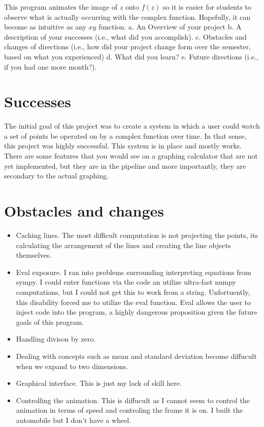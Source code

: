 \documentclass{article}
\begin{document}
    This program animates the image of $z$ onto $f(z)$ so it is easier for students to observe what is actually occurring with the complex function. Hopefully, it can become as intuitive as any $xy$ function.
    a.  An Overview of your project
    b.  A description of your successes (i.e., what did you accomplish).
    c.  Obstacles and changes of directions (i.e., how did your project change form over the semester, based on what you experienced)
    d.  What did you learn?  
    e.  Future directions (i.e., if you had one more month?).
\section{Successes}
    The initial goal of this project was to create a system in which a user could watch a set of points be operated on by a complex function over time. In that sense, this project was highly successful. This system is in place and mostly works. There are some features that you would see on a graphing calculator that are not yet implemented, but they are in the pipeline and more importantly, they are secondary to the actual graphing.
\section{Obstacles and changes}
    \begin{itemize}
        \item Caching lines. The most difficult computation is not projecting the points, its calculating the arrangement of the lines and creating the line objects themselves.
        \item Eval exposure. I ran into problems surrounding interpreting equations from sympy. I could enter functions via the code an utilize ultra-fast numpy computations, but I could not get this to work from a string. Unfortuently, this disability forced me to utilize the eval function. Eval allows the user to inject code into the program, a highly dangerous proposition given the future goals of this program.
        \item Handling divison by zero.
        \item Dealing with concepts such as mean and standard deviation become diffucult when we expand to two dimensions.
        \item Graphical interface. This is just my lack of skill here.
        \item Controlling the animation. This is diffucult as I cannot seem to control the animation in terms of speed and controling the frame it is on. I built the automobile but I don't have a wheel.
    \end{itemize}
\end{document}
